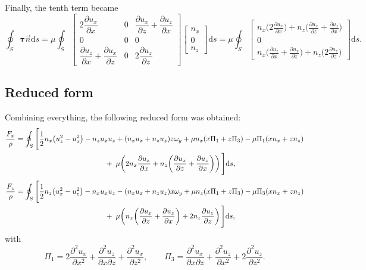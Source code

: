 \documentclass[wes, manuscript]{copernicus}
\begin{document}
Finally, the tenth term became
%
\begin{equation}
\oint_S \boldsymbol{\tau} \vec{n} \textrm{d}s
= \mu \!\oint_S
\begin{bmatrix}
2 \dfrac{\partial u_{x}}{\partial x} & 0 & \dfrac{\partial u_{x}}{\partial z} + \dfrac{\partial u_{z}}{\partial x} \\
0 & 0 & 0 \\
\dfrac{\partial u_{z}}{\partial x} + \dfrac{\partial u_{x}}{\partial z} & 0 & 2 \dfrac{\partial u_{z}}{\partial z}
\end{bmatrix}
\begin{bmatrix} n_{x} \\ 0 \\ n_{z} \end{bmatrix}\textrm{d}s
= \mu \!\oint_S
\begin{bmatrix}
n_{x} \big(2 \tfrac{\partial u_{x}}{\partial x}\big) + n_{z} \big(\tfrac{\partial u_{x}}{\partial z} + \tfrac{\partial u_{z}}{\partial x}\big) \\[6pt]
0 \\[6pt]
n_{x} \big(\tfrac{\partial u_{z}}{\partial x} + \tfrac{\partial u_{x}}{\partial z}\big) + n_{z} \big(2 \tfrac{\partial u_{z}}{\partial z}\big)
\end{bmatrix}\textrm{d}s .
\end{equation}
%

\subsection{Reduced form}
Combining everything, the following reduced form was obtained:
%
\begin{equation}
\begin{aligned}
\frac{F_{x}}{\rho} &= \oint_S \Bigg[
\frac{1}{2} n_{x}\!\left(u_{z}^2-u_{x}^2\right) - n_{z} u_{x} u_{z}
+ (n_{x} u_{x}+n_{z} u_{z}) z \omega_y
+\mu n_{x}(x\Pi_1+z\Pi_3) - \mu \Pi_1(x n_{x}+z n_{z}) \\
&\hspace{4.3cm}
+\;\mu\!\left(2n_{x} \frac{\partial u_{x}}{\partial x}
+ n_{z}\!\left(\frac{\partial u_{x}}{\partial z}+\frac{\partial u_{z}}{\partial x}\right)\right)
\Bigg] \textrm{d}s , \\[1ex]
\frac{F_{z}}{\rho} &= \oint_S \Bigg[
\frac{1}{2} n_{z}\!\left(u_{x}^2-u_{z}^2\right) - n_{x} u_{x} u_{z}
- (n_{x} u_{x}+n_{z} u_{z}) x \omega_y
+\mu n_{z}(x\Pi_1+z\Pi_3) - \mu \Pi_3(x n_{x}+z n_{z}) \\
&\hspace{4.3cm}
+\;\mu\!\left(n_{x}\!\left(\frac{\partial u_{x}}{\partial z}+\frac{\partial u_{z}}{\partial x}\right)
+ 2n_{z} \frac{\partial u_{z}}{\partial z}\right)
\Bigg] \textrm{d}s ,
\end{aligned}
\end{equation}
%
with
%
\begin{equation}
\Pi_1
= 2 \frac{\partial^2 u_{x}}{\partial x^2}
+ \frac{\partial^2 u_{z}}{\partial x \partial z}
+ \frac{\partial^2 u_{x}}{\partial z^2},
\qquad
\Pi_3
= \frac{\partial^2 u_{x}}{\partial x \partial z}
+ \frac{\partial^2 u_{z}}{\partial x^2}
+ 2 \frac{\partial^2 u_{z}}{\partial z^2} .
\end{equation}
%
\end{document}
